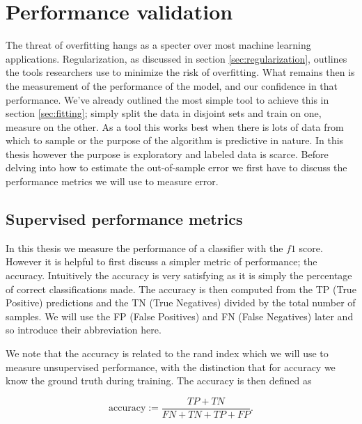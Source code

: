\section{Performance validation}\label{sec:performance_val}

The threat of overfitting hangs as a specter over most machine learning applications. Regularization, as discussed in section \ref{sec:regularization}, outlines the tools researchers use to minimize the risk of overfitting. What remains then is the measurement of the performance of the model, and our confidence in that performance. We've already outlined the most simple tool to achieve this in section \ref{sec:fitting}; simply split the data in disjoint sets and train on one, measure on the other. As a tool this works best when there is lots of data from which to sample or the purpose of the algorithm is predictive in nature. In this thesis however the purpose is exploratory and labeled data is scarce. Before delving into how to estimate the out-of-sample error we first have to discuss the performance metrics we will use to measure error. 

\subsection{Supervised performance metrics}\label{sec:supervised_perf}

In this thesis we measure the performance of a classifier with the $f1$ score. However it is helpful to first discuss a simpler metric of performance; the accuracy. Intuitively the accuracy is very satisfying as it is simply the percentage of correct classifications made. The accuracy is then computed from the TP (True Positive) predictions and the TN (True Negatives) divided by the total number of samples. We will use the FP (False Positives) and FN (False Negatives) later and so introduce their abbreviation here.

We note that the accuracy is related to the rand index which we will use to measure unsupervised performance, with the distinction that for accuracy we know the ground truth during training. The accuracy is then defined as 

\begin{equation}\label{eq:accuracy}
\text{accuracy} := \frac{TP + TN}{FN+ TN + TP+FP}.
\end{equation}

